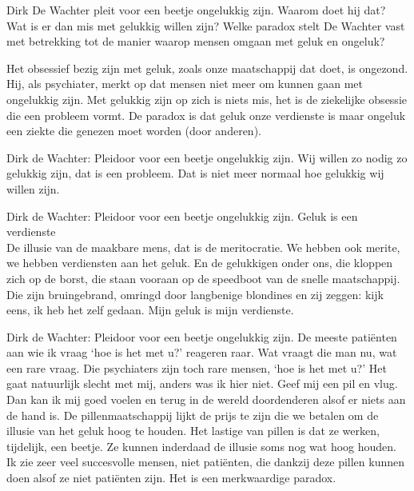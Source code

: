 \documentclass[main.tex]{subfiles}
\begin{document}
\begin{examenvraag}
    \begin{vraag}
        Dirk De Wachter pleit voor een beetje ongelukkig zijn.
        Waarom doet hij dat? Wat is er dan mis met gelukkig willen zijn?
        Welke paradox stelt De Wachter vast met betrekking tot de manier waarop mensen omgaan met geluk en ongeluk?
    \end{vraag}

    \begin{antwoord}
        Het obsessief bezig zijn met geluk, zoals onze maatschappij dat doet, is ongezond.
        Hij, als psychiater, merkt op dat mensen niet meer om kunnen gaan met ongelukkig zijn.
        Met gelukkig zijn op zich is niets mis, het is de ziekelijke obsessie die een probleem vormt.
        De paradox is dat geluk onze verdienste is maar ongeluk een ziekte die genezen moet worden (door anderen).
        \begin{citaat}{Dirk de Wachter: Pleidoor voor een beetje ongelukkig zijn.}
            Wij willen zo nodig zo gelukkig zijn, dat is een probleem.
            Dat is niet meer normaal hoe gelukkig wij willen zijn.
        \end{citaat}
        \begin{citaat}{Dirk de Wachter: Pleidoor voor een beetje ongelukkig zijn.}
            Geluk is een verdienste\\
            De illusie van de maakbare mens, dat is de meritocratie.
            We hebben ook merite, we hebben verdiensten aan het geluk.
            En de gelukkigen onder ons, die kloppen zich op de borst, die staan vooraan op de speedboot van de snelle maatschappij.
            Die zijn bruingebrand, omringd door langbenige blondines en zij zeggen: kijk eens, ik heb het zelf gedaan.
            Mijn geluk is mijn verdienste.
        \end{citaat}
        \begin{citaat}{Dirk de Wachter: Pleidoor voor een beetje ongelukkig zijn.}
            De meeste pati\"enten aan wie ik vraag `hoe is het met u?' reageren raar.
            Wat vraagt die man nu, wat een rare vraag.
            Die psychiaters zijn toch rare mensen, `hoe is het met u?'
            Het gaat natuurlijk slecht met mij, anders was ik hier niet.
            Geef mij een pil en vlug.
            Dan kan ik mij goed voelen en terug in de wereld doordenderen alsof er niets aan de hand is.
            De pillenmaatschappij lijkt de prijs te zijn die we betalen om de illusie van het geluk hoog te houden.
            Het lastige van pillen is dat ze werken, tijdelijk, een beetje.
            Ze kunnen inderdaad de illusie soms nog wat hoog houden.
            Ik zie zeer veel succesvolle mensen, niet pati\"enten, die dankzij deze pillen kunnen doen alsof ze niet pati\"enten zijn.
            Het is een merkwaardige paradox.
        \end{citaat}
    \end{antwoord}
\end{examenvraag}
\end{document}
